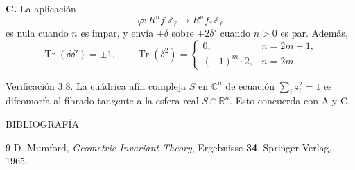 \medskip
\noindent\textbf{C.} La aplicación
\begin{equation*}
\varphi:R^nf_!\mathbb Z_\ell\longrightarrow R^nf_*\mathbb Z_\ell
\end{equation*}
es nula cuando $n$ es impar, y envía $\pm\delta$ sobre
$\pm2\delta'$ cuando $n>0$ es par. Además,
\begin{equation*}
\operatorname{Tr}(\delta\delta')=\pm1,
\qquad
\operatorname{Tr}(\delta^2)=
\begin{cases}
0, & n=2m+1,\\
(-1)^m\cdot2, & n=2m.
\end{cases}
\end{equation*}

\medskip
\noindent\underline{Verificación 3.8.}\quad
La cuádrica afín compleja $S$ en $\mathbb C^n$ de ecuación
$\sum_i z_i^2=1$ es difeomorfa al fibrado tangente a la esfera real
$S\cap\mathbb R^n$. Esto concuerda con A y C.

\bigskip
\begin{center}
\underline{BIBLIOGRAFÍA}
\end{center}

\begin{thebibliography}{9}
D. Mumford, \emph{Geometric Invariant Theory}, Ergebnisse \textbf{34},
Springer-Verlag, 1965.
\end{thebibliography}

